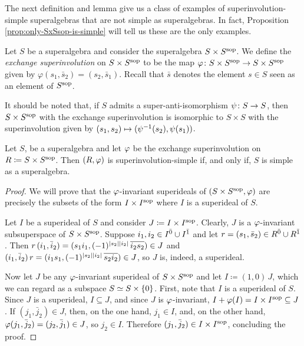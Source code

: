The next definition and lemma give us a class of examples of superinvolution-simple superalgebras that are not simple as superalgebras. 
In fact, Proposition \ref{prop:only-SxSsop-is-simple} will tell us these are the only examples. 

\begin{defi}\label{def:SxSsop}
    Let $S$ be a superalgebra and consider the superalgebra $S \times S^{\mathrm{sop}}$. 
    We define the \emph{exchange superinvolution} on $S \times S^{\mathrm{sop}}$ to be the map $\varphi\colon S \times S^{\mathrm{sop}} \to S \times S^{\mathrm{sop}}$ given by $\varphi (s_1, \bar s_2) = (s_2, \bar s_1)$. Recall that $\bar s$ denotes the element $s \in S$ seen as an element of $S^{\mathrm{sop}}$. 
\end{defi}

It should be noted that, if $S$ admits a super-anti-isomorphism $\psi\colon S \to S$, then $S\times S^{\mathrm{sop}}$ with the exchange superinvolution is isomorphic to $S\times S$ with the superinvolution given by $(s_1, s_2) \mapsto (\psi^{-1} (s_2), \psi (s_1))$.

\begin{lemma}\label{lemma:SxSsop-simple-iff-S-simple}
    Let $S$, be a superalgebra and let $\varphi$ be the exchange superinvolution on $R \coloneqq S \times S^{\mathrm{sop}}$. 
    Then $(R, \varphi)$ is superinvolution-simple if, and only if, $S$ is simple as a superalgebra. 
\end{lemma}

\begin{proof}
    We will prove that the $\varphi$-invariant superideals of $(S \times S^{\mathrm{sop}}, \varphi)$ are precisely the subsets of the form $I \times I^{\mathrm{sop}}$ where $I$ is a superideal of $S$. 
    
    Let $I$ be a superideal of $S$ and consider $J \coloneqq I \times I^{\mathrm{sop}}$. 
    Clearly, $J$ is a $\varphi$-invariant subsuperspace of $S \times S^{\mathrm{sop}}$. 
    Suppose $i_1, i_2 \in I^{\bar0} \cup I^{\bar1}$ and let $r = (s_1, \bar s_2) \in R^{\bar0} \cup R^{\bar1}$. 
    Then $r\, (i_1, \bar i_2) = (s_1 i_1, (-1)^{|s_2||i_2|}\, \overline{i_2 s_2}) \in J$ and $(i_1, \bar i_2)\, r = (i_1 s_1, (-1)^{|s_2||i_2|}\, \overline{s_2 i_2}) \in J$, so $J$ is, indeed, a superideal.
    
    Now let $J$ be any $\varphi$-invariant superideal of $S\times S^{\mathrm{sop}}$ and let $I \coloneqq (1,0)\, J$, which we can regard as a subspace $S \simeq S \times \{ 0 \}$. 
    First, note that $I$ is a superideal of $S$.
    Since $J$ is a superideal, $I \subseteq J$, and since $J$ is $\varphi$-invariant, $I + \varphi(I) = I \times I^{\mathrm{sop}} \subseteq J$.
    If $(j_1, \bar j_2) \in J$, then, on the one hand, $j_1 \in I$, and, on the other hand, $\varphi(j_1, \bar j_2) = (j_2, \bar j_1) \in J$, so $j_2 \in I$. 
    Therefore $(j_1, \bar j_2)\in I \times I^{\mathrm{sop}}$, concluding the proof.
\end{proof}

